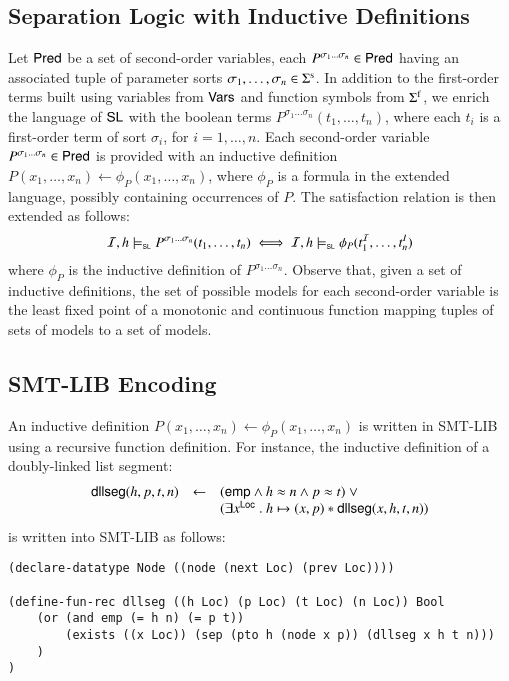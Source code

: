 \documentclass{llncs}
\begin{document}
\subsection{Separation Logic with Inductive Definitions}

Let $\mathsf{Pred}$ be a set of second-order variables, each $P^{\sigma_1
  \ldots \sigma_n} \in \mathsf{Pred}$ having an associated tuple of parameter
sorts $\sigma_1, \ldots, \sigma_n \in \Sigma^\mathrm{s}$. In addition to
the first-order terms built using variables from $\mathsf{Vars}$ and function
symbols from $\Sigma^\mathrm{f}$, we enrich the language of $\mathsf{SL}$
with the boolean terms $P^{\sigma_1 \ldots \sigma_n}(t_1, \ldots,
t_n)$, where each $t_i$ is a first-order term of sort $\sigma_i$, for
$i=1,\ldots,n$. Each second-order variable $P^{\sigma_1 \ldots
  \sigma_n} \in \mathsf{Pred}$ is provided with an inductive definition
$P(x_1,\ldots,x_n) \leftarrow \phi_P(x_1,\ldots,x_n)$, where $\phi_P$
is a formula in the extended language, possibly containing occurrences
of $P$. The satisfaction relation is then extended as follows:
\[\mathcal{I},h \models_{\mathsf{\scriptscriptstyle{SL}}} P^{\sigma_1 \ldots \sigma_n}(t_1,\ldots,t_n) \iff 
\mathcal{I},h \models_{\mathsf{\scriptscriptstyle{SL}}} \phi_P(t^{\mathcal{I}}_1,\ldots,t^I_n)\] where
$\phi_P$ is the inductive definition of $P^{\sigma_1 \ldots
  \sigma_n}$. Observe that, given a set of inductive definitions, the
set of possible models for each second-order variable is the least
fixed point of a monotonic and continuous function mapping tuples of
sets of models to a set of models.

\subsection{SMT-LIB Encoding}

An inductive definition $P(x_1,\ldots,x_n) \leftarrow
\phi_P(x_1,\ldots,x_n)$ is written in SMT-LIB using a recursive
function definition. For instance, the inductive definition of a 
doubly-linked list segment:
\[\begin{array}{rcl}
\mathsf{dllseg}(h, p, t, n) & \leftarrow & (\mathsf{emp} \wedge h \approx n \wedge p \approx t) ~\vee \\
&& (\exists x^{\mathsf{Loc}} ~.~ h \mapsto (x,p) * \mathsf{dllseg}(x,h,t,n))
\end{array}\]
is written into SMT-LIB as follows: 
\begin{verbatim}
(declare-datatype Node ((node (next Loc) (prev Loc))))

(define-fun-rec dllseg ((h Loc) (p Loc) (t Loc) (n Loc)) Bool
    (or (and emp (= h n) (= p t))
        (exists ((x Loc)) (sep (pto h (node x p)) (dllseg x h t n)))
    )
)
\end{verbatim}
\end{document}
